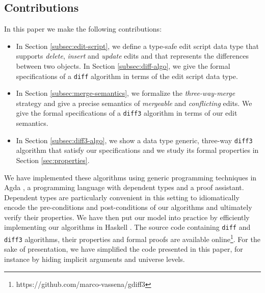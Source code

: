 \documentclass{sigplanconf}
\theoremstyle{plain}
\begin{document}

\subsection{Contributions}
In this paper we make the following contributions:
\begin{itemize}
\item In Section \ref{subsec:edit-script}, we define a type-safe edit script data 
      type that supports \emph{delete}, \emph{insert} and \emph{update} edits and 
      that represents the differences between two objects. In Section 
      \ref{subsec:diff-algo}, we give the formal specifications of a \texttt{diff} 
      algorithm in terms of the edit script data type.
\item In Section \ref{subsec:merge-semantics}, we formalize the 
      \emph{three-way-merge} strategy and give a precise semantics of 
      \emph{mergeable} and \emph{conflicting} edits. We give 
      the formal specifications of a \texttt{diff3} algorithm in terms of our edit 
      semantics. 
\item In Section \ref{subsec:diff3-algo}, we show a data type generic, three-way 
      \texttt{diff3} algorithm that satisfy our specifications and we study its 
      formal properties in Section \ref{sec:properties}.
\end{itemize}
We have implemented these algorithms using generic programming
techniques in Agda \cite{Bove09}, a programming language with dependent
types and a proof assistant. Dependent types are particularly
convenient in this setting to idiomatically encode the pre-conditions
and post-conditions of our algorithms and ultimately verify their
properties.
%
We have then put our model into practice by efficiently implementing
our algorithms in Haskell \cite{Marlow_haskell2010}.
%
%
The source code containing \texttt{diff} and \texttt{diff3}
algorithms, their properties and formal proofs are available
online\footnote{https://github.com/marco-vassena/gdiff3}.  For the
sake of presentation, we have simplified the code presented in this
paper, for instance by hiding implicit arguments and universe levels.
\end{document}

